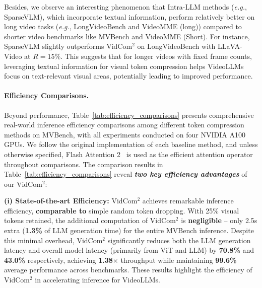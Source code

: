 Besides, we observe an interesting phenomenon that Intra-LLM methods (\textit{e.g.}, SparseVLM), which incorporate textual information, perform relatively better on long video tasks (\textit{e.g.}, LongVideoBench and VideoMME (long)) compared to shorter video benchmarks like MVBench and VideoMME (Short). For instance, SparseVLM slightly outperforms VidCom$^2$ on LongVideoBench with LLaVA-Video at $R=15\%$. This suggests that for longer videos with fixed frame counts, leveraging textual information for visual token compression helps VideoLLMs focus on text-relevant visual areas, potentially leading to improved performance.


\paragraph{Efficiency Comparisons.}

Beyond performance, Table~\ref{tab:efficiency_comparisons} presents comprehensive real-world inference efficiency comparisons among different token compression methods on MVBench, with all experiments conducted on four NVIDIA A100 GPUs. We follow the original implementation of each baseline method, and unless otherwise specified, Flash Attention 2~\cite{daoFlashAttention-2} is used as the efficient attention operator throughout comparisons. The comparison results in Table~\ref{tab:efficiency_comparisons} reveal \textbf{\emph{two key efficiency advantages}} of our VidCom$^2$:

\noindent \textbf{(i) State-of-the-art Efficiency:} VidCom$^2$ achieves remarkable inference efficiency, \textbf{comparable to} simple random token dropping. With 25\% visual tokens retained, the additional computation of VidCom$^2$ is \textbf{negligible} -- only 2.5s extra (\textbf{1.3\%} of LLM generation time) for the entire MVBench inference. Despite this minimal overhead, VidCom$^2$ significantly reduces both the LLM generation latency and overall model latency (primarily from ViT and LLM) by \textbf{70.8\%} and \textbf{43.0\%} respectively, achieving \textbf{1.38$\times$} throughput while maintaining \textbf{99.6\%} average performance across benchmarks. These results highlight the efficiency of VidCom$^2$ in accelerating inference for VideoLLMs.



